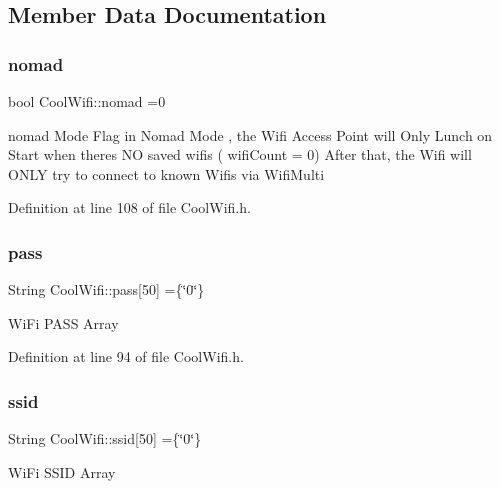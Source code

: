 \subsection{Member Data Documentation}
\mbox{\label{class_cool_wifi_ab7d9643c4af7bac3be331ef008b2ea27}} 
\subsubsection{\texorpdfstring{nomad}{nomad}}
{\footnotesize\ttfamily bool Cool\+Wifi\+::nomad =0\hspace{0.3cm}{\ttfamily [private]}}

nomad Mode Flag in Nomad Mode , the Wifi Access Point will Only Lunch on Start when there\textquotesingle{}s NO saved wifis ( wifi\+Count = 0) After that, the Wifi will O\+N\+LY try to connect to known Wifis via Wifi\+Multi 

Definition at line 108 of file Cool\+Wifi.\+h.

\mbox{\label{class_cool_wifi_a0c3332a149245aaad060b32593a54c9b}} 
\subsubsection{\texorpdfstring{pass}{pass}}
{\footnotesize\ttfamily String Cool\+Wifi\+::pass\mbox{[}50\mbox{]} =\{\char`\"{}0\char`\"{}\}\hspace{0.3cm}{\ttfamily [private]}}

Wi\+Fi P\+A\+SS Array 

Definition at line 94 of file Cool\+Wifi.\+h.

\mbox{\label{class_cool_wifi_a893b21d0fed821438733bba2e73fb4c2}} 
\subsubsection{\texorpdfstring{ssid}{ssid}}
{\footnotesize\ttfamily String Cool\+Wifi\+::ssid\mbox{[}50\mbox{]} =\{\char`\"{}0\char`\"{}\}\hspace{0.3cm}{\ttfamily [private]}}

Wi\+Fi S\+S\+ID Array 

